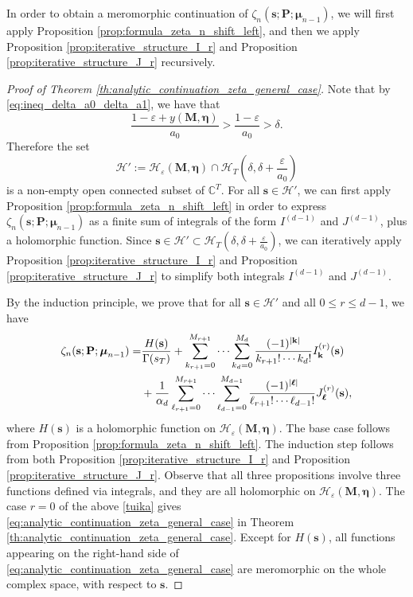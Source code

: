 \documentclass[a4paper,12pt]{article}
\theoremstyle{definition}
\numberwithin{equation}{section}
\begin{document}
In order to obtain a meromorphic continuation of $\zeta_{n}(\mathbf{s};\mathbf{P};\boldsymbol{\mu}_{n-1})$, we will first apply Proposition \ref{prop:formula_zeta_n_shift_left}, and then we apply Proposition \ref{prop:iterative_structure_I_r} and Proposition \ref{prop:iterative_structure_J_r} recursively.

\begin{proof}[Proof of Theorem \ref{th:analytic_continuation_zeta_general_case}]
Note that by \eqref{eq:ineq_delta_a0_delta_a1}, we have that 
$$ \frac{1-\varepsilon+y(\mathbf{M},\boldsymbol{\eta})}{a_0}> \frac{1-\varepsilon}{a_0}>\delta.$$
Therefore the set 
$$ \mathcal{H}':=\mathcal{H}_{\varepsilon}(\mathbf{M},\boldsymbol{\eta}) \cap \mathcal{H}_T(\delta,\delta+\frac{\varepsilon}{a_0})$$
is a non-empty open connected subset of $\mathbb{C}^T$. For all $\mathbf{s} \in \mathcal{H}'$, we can first apply Proposition \ref{prop:formula_zeta_n_shift_left} in order to express $\zeta_{n}(\mathbf{s};\mathbf{P};\boldsymbol{\mu}_{n-1})$ as a finite sum of integrals of the form $I^{(d-1)}$ and $J^{(d-1)}$, plus a holomorphic function. Since $\mathbf{s} \in \mathcal{H}' \subset \mathcal{H}_T(\delta,\delta+\frac{\varepsilon}{a_0})$, we can iteratively apply Proposition \ref{prop:iterative_structure_I_r} and Proposition \ref{prop:iterative_structure_J_r} to simplify both integrals $I^{(d-1)}$ and $J^{(d-1)}$.

By the induction principle, we prove that for all $\mathbf{s} \in \mathcal{H}'$ and all $0 \leq r \leq d-1$, we have
\begin{align}\label{tuika}
    \zeta_{n}(\mathbf{s};\mathbf{P};\boldsymbol{\mu}_{n-1})=&\frac{H(\mathbf{s})}{\Gamma(s_T)}+ \sum_{k_{r+1}=0}^{M_{r+1}} \cdots \sum_{k_d=0}^{M_d} \frac{(-1)^{|\mathbf{k}|}}{k_{r+1}!\cdots k_d!} I^{(r)}_{\mathbf{k}}(\mathbf{s}) \notag\\
    &+ \frac{1}{\alpha_d}\sum_{\ell_{r+1}=0}^{M_{r+1}} \cdots \sum_{\ell_{d-1}=0}^{M_{d-1}} \frac{(-1)^{|\boldsymbol{\ell}|}}{\ell_{r+1}!\cdots \ell_{d-1}!} J^{(r)}_{\boldsymbol{\ell}}(\mathbf{s}),
\end{align}
where $H(\mathbf{s})$ is a holomorphic function on $\mathcal{H}_{\varepsilon}(\mathbf{M},\boldsymbol{\eta})$. The base case follows from Proposition \ref{prop:formula_zeta_n_shift_left}. The induction step follows from both Proposition \ref{prop:iterative_structure_I_r} and Proposition \ref{prop:iterative_structure_J_r}. Observe that all three propositions involve three functions defined via integrals, and they are all holomorphic on $\mathcal{H}_{\varepsilon}(\mathbf{M},\boldsymbol{\eta})$. 
The case $r=0$ of the above \eqref{tuika} gives
\eqref{eq:analytic_continuation_zeta_general_case} 
in Theorem \ref{th:analytic_continuation_zeta_general_case}.
 Except for $H(\mathbf{s})$, all functions appearing on the
 right-hand side of 
\eqref{eq:analytic_continuation_zeta_general_case} are
meromorphic 
on the whole complex space, with respect to $\mathbf{s}$.
\end{proof}
\end{document}
